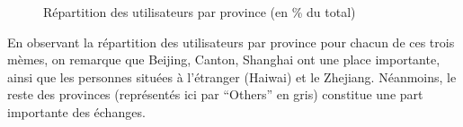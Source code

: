 \begin{figure}
  \caption{
    R\'epartition des utilisateurs par province (en \% du total)
  }
\end{figure}



En observant la r\'epartition des utilisateurs par province pour chacun
de ces trois m\`emes, on remarque que Beijing, Canton, Shanghai ont une
place importante, ainsi que les personnes situ\'ees \`a
l{\textquoteright}\'etranger (Haiwai) et le Zhejiang. N\'eanmoins, le
reste des provinces (repr\'esent\'es ici par
{\textquotedblleft}Others{\textquotedblright} en gris) constitue une
part importante des \'echanges.

